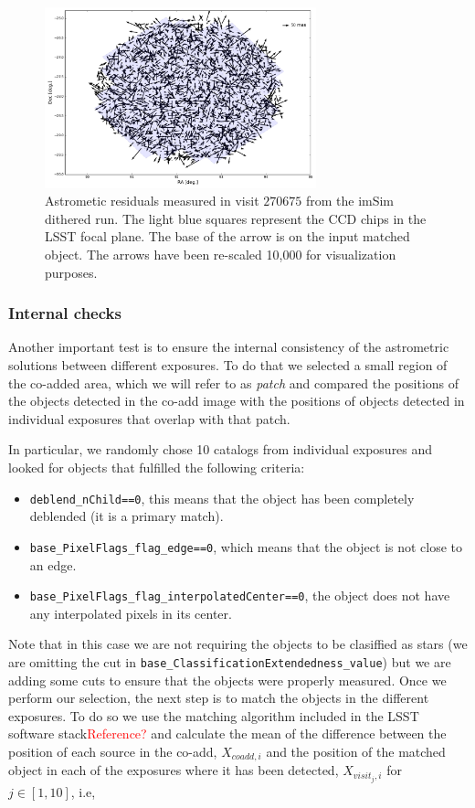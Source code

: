 \documentclass[\docopts]{\docclass}
\begin{document}
\begin{figure}
  \centering
  \includegraphics[width=0.7\textwidth]{astrometry_imsim_dithered_interp}
  \caption{Astrometic residuals measured in visit $270675$ from the imSim dithered run. The light blue squares represent the CCD chips in
  the LSST focal plane. The base of the arrow is on the input matched object. The arrows have been re-scaled 10,000 for visualization purposes.}
  \label{fig:astrometry_c}
\end{figure}


\subsubsection{Internal checks}
\label{sec:internal_astrometry}

Another important test is to ensure the internal consistency of the astrometric solutions between different exposures. To do that we selected
a small region of the co-added area, which we will refer to as \textit{patch} and compared the positions of the objects detected in the co-add
image with the positions of objects detected in individual exposures that overlap with that patch.

In particular, we randomly chose 10 catalogs from individual exposures and looked for objects that fulfilled the following criteria:
\begin{itemize}
  \item \texttt{deblend\_nChild==0}, this means that the object has been completely deblended (it is a primary match).
  \item \texttt{base\_PixelFlags\_flag\_edge==0}, which means that the object is not close to an edge.
  \item \texttt{base\_PixelFlags\_flag\_interpolatedCenter==0}, the object does not have any interpolated pixels in its center.
\end{itemize}

Note that in this case we are not requiring the objects to be clasiffied as stars (we are omitting the cut in
\texttt{base\_ClassificationExtendedness\_value}) but we are adding some cuts to ensure that the objects were properly measured. Once
we perform our selection, the next step is to match the objects in the different exposures. To do so we use the matching algorithm
included in the LSST software stack\textcolor{red}{Reference?} and calculate the mean of the difference between the position of each source
in the co-add, $X_{coadd,i}$ and the position of the matched object in each of the exposures where it has been detected, $X_{visit_{j},i}$
for $j \in [1,10]$, i.e,
\end{document}
